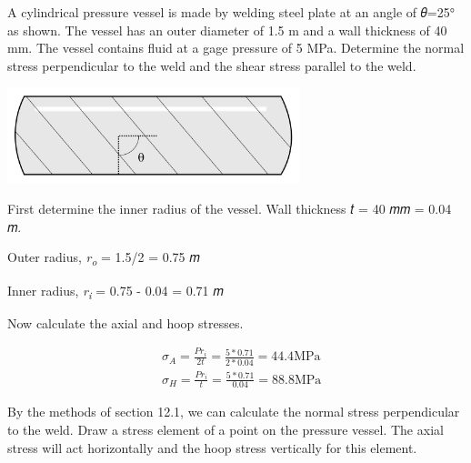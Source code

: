 \documentclass[
  letterpaper,
  DIV=11,
  numbers=noendperiod]{scrreprt}
\begin{document}
\begin{tcolorbox}[enhanced jigsaw, breakable, opacityback=0, toptitle=1mm, left=2mm, colback=white, opacitybacktitle=0.6, colframe=quarto-callout-note-color-frame, titlerule=0mm, arc=.35mm, leftrule=.75mm, bottomtitle=1mm, colbacktitle=quarto-callout-note-color!10!white, rightrule=.15mm, title={Example 13.2: Needs title}, bottomrule=.15mm, toprule=.15mm, coltitle=black]

A cylindrical pressure vessel is made by welding steel plate at an angle
of 𝜃=25° as shown. The vessel has an outer diameter of 1.5 m and a wall
thickness of 40 mm. The vessel contains fluid at a gage pressure of 5
MPa. Determine the normal stress perpendicular to the weld and the shear
stress parallel to the weld.

\begin{center}
\includegraphics[width=3.34375in,height=\textheight]{images/CH13 PNGs/example 13.2 part 1.png}
\end{center}

\begin{tcolorbox}[enhanced jigsaw, breakable, opacityback=0, toptitle=1mm, left=2mm, colback=white, opacitybacktitle=0.6, colframe=quarto-callout-note-color-frame, titlerule=0mm, arc=.35mm, leftrule=.75mm, bottomtitle=1mm, colbacktitle=quarto-callout-note-color!10!white, rightrule=.15mm, title={Solution}, bottomrule=.15mm, toprule=.15mm, coltitle=black]

First determine the inner radius of the vessel. Wall thickness 𝑡 = 40 𝑚𝑚
= 0.04 𝑚.

Outer radius, \emph{r\textsubscript{o}} = 1.5/2 = 0.75 𝑚

Inner radius, \emph{r\textsubscript{i}} = 0.75 - 0.04 = 0.71 𝑚

Now calculate the axial and hoop stresses.

\[
\begin{aligned}
& \sigma_A=\frac{P r_i}{2 t}=\frac{5 * 0.71}{2 * 0.04}=44.4 \mathrm{MPa} \\
& \sigma_H=\frac{P r_i}{t}=\frac{5 * 0.71}{0.04}=88.8 \mathrm{MPa}
\end{aligned}
\]

By the methods of section 12.1, we can calculate the normal stress
perpendicular to the weld. Draw a stress element of a point on the
pressure vessel. The axial stress will act horizontally and the hoop
stress vertically for this element.


\end{tcolorbox}
\end{tcolorbox}
\end{document}
